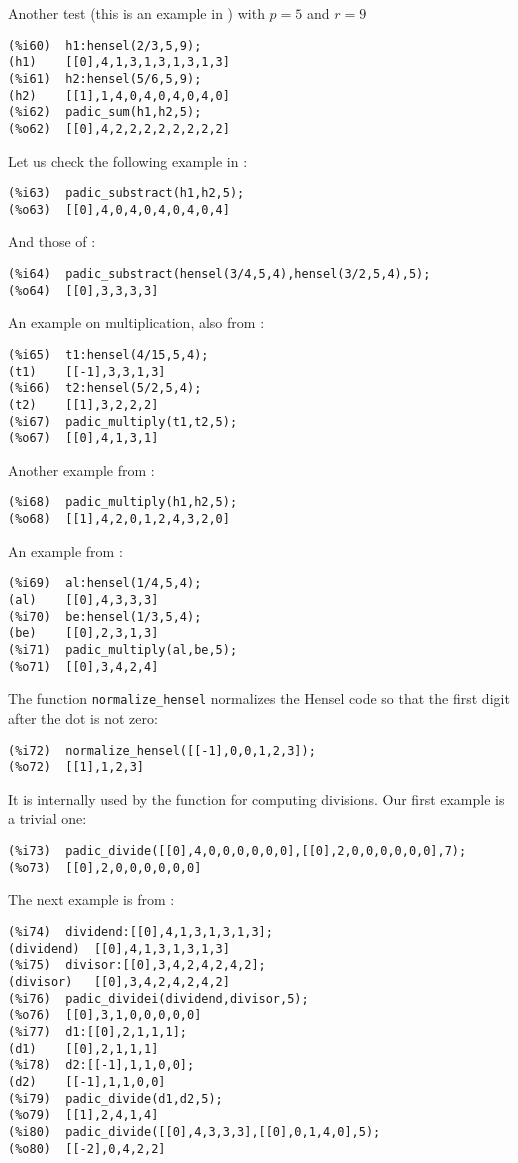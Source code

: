 \documentclass[fleqn]{cas-sc}
\begin{document}
Another test (this is an example in \cite{2}) with $p=5$ and $r=9$
\begin{verbatim}
(%i60)	h1:hensel(2/3,5,9);
(h1)	[[0],4,1,3,1,3,1,3,1,3]
(%i61)	h2:hensel(5/6,5,9);
(h2)	[[1],1,4,0,4,0,4,0,4,0]
(%i62)	padic_sum(h1,h2,5);
(%o62)	[[0],4,2,2,2,2,2,2,2,2]
\end{verbatim}

Let us check the following example in \cite{2}:
\begin{verbatim}
(%i63)	padic_substract(h1,h2,5);
(%o63)	[[0],4,0,4,0,4,0,4,0,4]
\end{verbatim}

And those of \cite{3}:
\begin{verbatim}
(%i64)	padic_substract(hensel(3/4,5,4),hensel(3/2,5,4),5);
(%o64)	[[0],3,3,3,3]
\end{verbatim}

An example on multiplication, also from \cite{3}:
\begin{verbatim}
(%i65)	t1:hensel(4/15,5,4);
(t1)	[[-1],3,3,1,3]
(%i66)	t2:hensel(5/2,5,4);
(t2)	[[1],3,2,2,2]
(%i67)	padic_multiply(t1,t2,5);
(%o67)	[[0],4,1,3,1]
\end{verbatim}

Another example from \cite{2}:
\begin{verbatim}
(%i68)	padic_multiply(h1,h2,5);
(%o68)	[[1],4,2,0,1,2,4,3,2,0]
\end{verbatim}

An example from \cite{4}:
\begin{verbatim}
(%i69)	al:hensel(1/4,5,4);
(al)	[[0],4,3,3,3]
(%i70)	be:hensel(1/3,5,4);
(be)	[[0],2,3,1,3]
(%i71)	padic_multiply(al,be,5);
(%o71)	[[0],3,4,2,4]
\end{verbatim}

The function \texttt{normalize\_hensel} normalizes the Hensel code so that the
first digit after the dot is not zero:
\begin{verbatim}
(%i72)	normalize_hensel([[-1],0,0,1,2,3]);
(%o72)	[[1],1,2,3]
\end{verbatim}
It is internally used by the function for computing divisions. Our first
example is a trivial one:
\begin{verbatim}
(%i73)	padic_divide([[0],4,0,0,0,0,0,0],[[0],2,0,0,0,0,0,0],7);
(%o73)	[[0],2,0,0,0,0,0,0]
\end{verbatim}

The next example is from \cite{2}:
\begin{verbatim}
(%i74)	dividend:[[0],4,1,3,1,3,1,3];
(dividend)	[[0],4,1,3,1,3,1,3]
(%i75)	divisor:[[0],3,4,2,4,2,4,2];
(divisor)	[[0],3,4,2,4,2,4,2]
(%i76)	padic_dividei(dividend,divisor,5);
(%o76)	[[0],3,1,0,0,0,0,0]
(%i77)	d1:[[0],2,1,1,1];
(d1)	[[0],2,1,1,1]
(%i78)	d2:[[-1],1,1,0,0];
(d2)	[[-1],1,1,0,0]
(%i79)	padic_divide(d1,d2,5);
(%o79)	[[1],2,4,1,4]
(%i80)	padic_divide([[0],4,3,3,3],[[0],0,1,4,0],5);
(%o80)	[[-2],0,4,2,2]
\end{verbatim}
\end{document}
